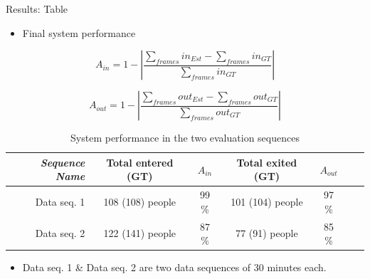 \documentclass[final,hyperref={pdfpagelabels=false}]{beamer}
\begin{document}
\begin{frame}[t]
\begin{columns}[t]
\begin{column}{.465\textwidth}
\begin{block}{Results: Table}

\begin{itemize}
\item Final system performance
\end{itemize}

\begin{equation}
\label{eq:in_accuracy}
A_{in} = 1 - |\frac{\sum_{frames}{in_{Est}}-\sum_{frames}{in_{GT}}}{\sum_{frames}in_{GT}}|
\end{equation} 

\begin{equation}
\label{eq:out_accuracy}
A_{out} = 1 - |\frac{\sum_{frames}{out_{Est}}-\sum_{frames}out_{GT}}{\sum_{frames}out_{GT}}| 
\end{equation} 


\begin{table}[h]
\centering
	\begin{tabular}{r | c | c | c | c | c | c }
		\emph{Sequence Name}		&  Total entered (GT) & \emph{$A_{in}$} & Total exited (GT) & \emph{$A_{out}$} \\
		\hline \hline
		Data seq. 1			& 108 (108) people & 99 \% & 101 (104) people & 97 \% \\
		Data seq. 2			& 122 (141) people & 87 \% & 77 (91) people & 85 \%  \\
		\end{tabular}
	\caption{System performance in the two evaluation sequences}
\end{table}

\begin{itemize}
\item Data seq. 1 \& Data seq. 2 are two data sequences of 30 minutes each. 
\end{itemize}
     
\end{block}







\end{column}
\end{columns}
\end{frame}
\end{document}
